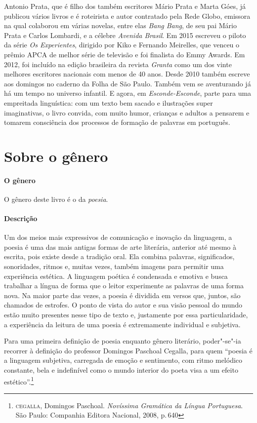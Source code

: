\documentclass[11pt]{extarticle}
\begin{document}
Antonio Prata, que é  filho dos também escritores Mário Prata e Marta Góes, já publicou vários livros e é roteirista e autor contratado pela Rede Globo, emissora na qual colaborou em várias novelas, entre elas \textit{Bang Bang}, de seu pai Mário Prata e Carlos Lombardi, e a célebre \textit{Avenida Brasil}. Em 2015 escreveu o piloto da série \textit{Os Experientes}, dirigido por Kiko e Fernando Meirelles, que venceu o prêmio APCA de melhor série de televisão e foi finalista do Emmy Awards. Em 2012, foi incluído na edição brasileira da revista \textit{Granta} como um dos vinte melhores escritores nacionais com menos de 40 anos. Desde 2010 também escreve aos domingos no caderno da Folha de São Paulo. Também vem se aventurando já há um tempo no universo infantil. E agora, em \textit{Esconde-Esconde}, parte para uma empreitada linguística: com um texto bem sacado e ilustrações super imaginativas, o livro convida, com muito humor, crianças e adultos a pensarem e tomarem consciência dos processos de formação de palavras em português.

\section{Sobre o gênero}

\paragraph{O gênero} O gênero deste livro é o da \textit{poesia}. 

\paragraph{Descrição} Um dos meios mais expressivos de comunicação e inovação da linguagem, a poesia é uma das mais antigas formas de arte literária, anterior até mesmo à escrita, pois existe desde a tradição oral. Ela combina palavras, significados, sonoridades, ritmos e, muitas vezes, também imagens para permitir uma experiência estética. A linguagem poética é condensada e emotiva e busca trabalhar a língua de forma que o leitor experimente as palavras de uma forma nova. Na maior parte das vezes, a poesia é dividida em versos que, juntos, são chamados de estrofes. O ponto de vista do autor e sua visão pessoal do mundo estão muito presentes nesse tipo de texto e, justamente por essa particularidade, a experiência da leitura de uma poesia é extremamente individual e subjetiva.

Para uma primeira definição de poesia enquanto gênero literário, poder"-se"-ia recorrer à definição do professor Domingos Paschoal Cegalla, para quem ``poesia é a linguagem subjetiva, carregada de emoção e sentimento, com ritmo melódico constante, bela e indefinível como o mundo interior do poeta visa a um efeito estético''.\footnote{\textsc{cegalla}, Domingos Paschoal. \textit{Novíssima Gramática da Língua Portuguesa}. São Paulo: Companhia Editora Nacional, 2008, p.\,640}
\end{document}
